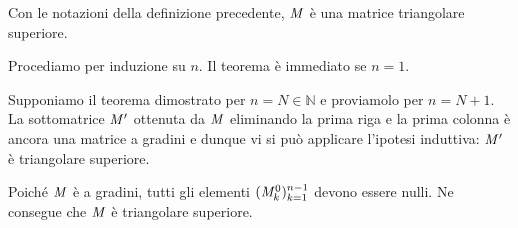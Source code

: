 \begin{Theorem}
  Con le notazioni della definizione precedente, $\mathit{M}$ \`e una matrice
  triangolare superiore.
\end{Theorem}
\Proof Procediamo per induzione su $n$. Il teorema \`e immediato se $n = 1$.
\par Supponiamo il teorema dimostrato per $n = N \in \mathbb{N}$ e proviamolo
per $n = N + 1$. La sottomatrice $\mathit{M}'$ ottenuta da $\mathit{M}$
eliminando la prima riga e la prima colonna \`e ancora una matrice a gradini
e dunque vi si pu\`o applicare l'ipotesi induttiva: $\mathit{M}'$ \`e
triangolare superiore.
\par Poich\'e $\mathit{M}$ \`e a gradini, tutti gli elementi
$(\mathit{M}_k^0)_{k = 1}^{n - 1}$ devono essere nulli. Ne consegue che
$\mathit{M}$ \`e triangolare superiore. \EndProof
